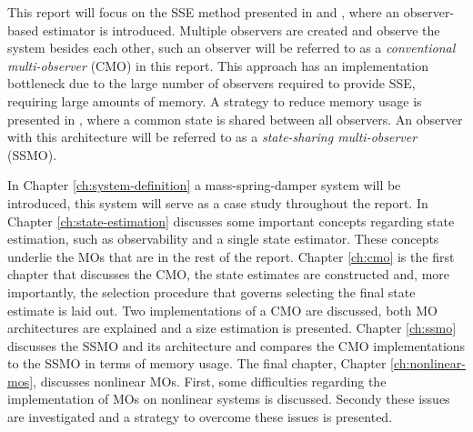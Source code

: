 This report will focus on the SSE method presented in \cite{Chong2015ObservabilityAttacks} and \cite{Chong2020AAttacks}, where an observer-based estimator is introduced. Multiple observers are created and observe the system besides each other, such an observer will be referred to as a \textit{conventional multi-observer} (CMO) in this report. This approach has an implementation bottleneck due to the large number of observers required to provide SSE, requiring large amounts of memory. A strategy to reduce memory usage is presented in \cite{Chong2023MemoryAlgorithms}, where a common state is shared between all observers. An observer with this architecture will be referred to as a \textit{state-sharing multi-observer} (SSMO). 

In Chapter \ref{ch:system-definition} a mass-spring-damper system will be introduced, this system will serve as a case study throughout the report. In Chapter \ref{ch:state-estimation} discusses some important concepts regarding state estimation, such as observability and a single state estimator. These concepts underlie the MOs that are in the rest of the report. Chapter \ref{ch:cmo} is the first chapter that discusses the CMO, the state estimates are constructed and, more importantly, the selection procedure that governs selecting the final state estimate is laid out. Two implementations of a CMO are discussed, both MO architectures are explained and a size estimation is presented. Chapter \ref{ch:ssmo} discusses the SSMO and its architecture and compares the CMO implementations to the SSMO in terms of memory usage. The final chapter, Chapter \ref{ch:nonlinear-mos}, discusses nonlinear MOs. First, some difficulties regarding the implementation of MOs on nonlinear systems is discussed. Secondy these issues are investigated and a strategy to overcome these issues is presented.